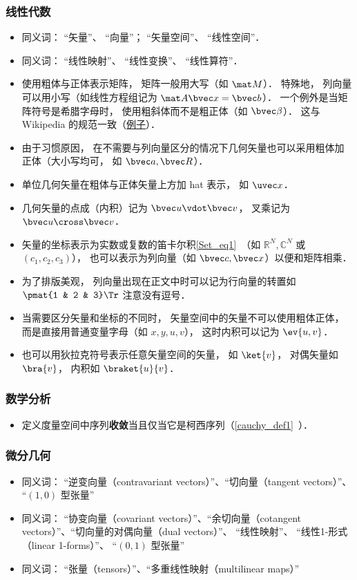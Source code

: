 \subsubsection{线性代数}
\begin{itemize}
\item 同义词： “矢量”、 “向量”； “矢量空间”、 “线性空间”．
\item 同义词： “线性映射”、 “线性变换”、 “线性算符”．
\item 使用粗体与正体表示矩阵， 矩阵一般用大写（如 $\mat M$）． 特殊地， 列向量可以用小写（如线性方程组记为 $\mat A \bvec x = \bvec b$）． 一个例外是当矩阵符号是希腊字母时， 使用粗斜体而不是粗正体（如 $\bvec \beta$）． 这与 Wikipedia 的规范一致（\href{https://en.wikipedia.org/wiki/Angular_acceleration}{例子}）．
\item 由于习惯原因， 在不需要与列向量区分的情况下几何矢量也可以采用粗体加正体（大小写均可， 如 $\bvec a, \bvec R$）．
\item 单位几何矢量在粗体与正体矢量上方加 hat 表示， 如 $\uvec x$．
\item 几何矢量的点成（内积）记为 $\bvec u \vdot \bvec v$， 叉乘记为 $\bvec u \cross \bvec v$．
\item 矢量的坐标表示为实数或复数的笛卡尔积\autoref{Set_eq1}~（如 $\mathbb R^N, \mathbb C^N$ 或 $(c_1, c_2, c_3)$）， 也可以表示为列向量（如 $\bvec c, \bvec x$）以便和矩阵相乘．
\item 为了排版美观， 列向量出现在正文中时可以记为行向量的转置如 $\pmat{1 & 2 & 3}\Tr$ 注意没有逗号．
\item 当需要区分矢量和坐标的不同时， 矢量空间中的矢量不可以使用粗体正体， 而是直接用普通变量字母（如 $x, y, u, v$）， 这时内积可以记为 $\ev{u, v}$．
\item 也可以用狄拉克符号表示任意矢量空间的矢量， 如 $\ket{v}$， 对偶矢量如 $\bra{v}$， 内积如 $\braket{u}{v}$．
\end{itemize}

\subsubsection{数学分析}
\begin{itemize}
\item 定义度量空间中序列\textbf{收敛}当且仅当它是柯西序列（\autoref{cauchy_def1}~）．
\end{itemize}

\subsubsection{微分几何}
\begin{itemize}
\item 同义词： “逆变向量（contravariant vectors）”、“切向量（tangent vectors）”、 “$(1, 0)$ 型张量”
\item 同义词： “协变向量（covariant vectors）”、“余切向量（cotangent vectors）”、“切向量的对偶向量（dual vectors）”、 “线性映射”、 “线性1-形式（linear 1-forms）”、 “$(0, 1)$ 型张量”
\item 同义词： “张量（tensors）”、“多重线性映射（multilinear maps）”
\end{itemize}


